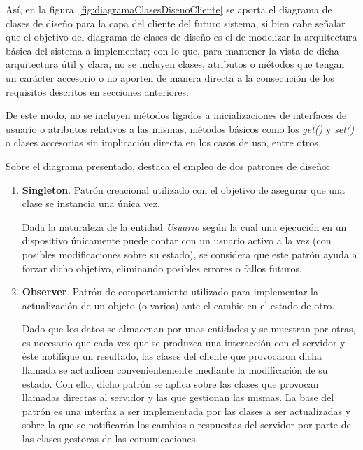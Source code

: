 Así, en la figura~\ref{fig:diagramaClasesDisenoCliente} se aporta el diagrama de clases de diseño para la capa del cliente del futuro sistema, si bien cabe señalar que el objetivo del diagrama de clases de diseño es el de modelizar la arquitectura básica del sistema a implementar; con lo que, para mantener la vista de dicha arquitectura útil y clara, no se incluyen clases, atributos o métodos que tengan un carácter accesorio o no aporten de manera directa a la consecución de los requisitos descritos en secciones anteriores. 

De este modo, no se incluyen métodos ligados a inicializaciones de interfaces de usuario o atributos relativos a las mismas, métodos básicos como los \textit{get()} y \textit{set()} o clases accesorias sin implicación directa en los casos de uso, entre otros.

Sobre el diagrama presentado, destaca el empleo de dos patrones de diseño:

\begin{enumerate}
	\item \textbf{Singleton}. Patrón creacional utilizado con el objetivo de asegurar que una clase se instancia una única vez. 
	
	Dada la naturaleza de la entidad \emph{Usuario} según la cual una ejecución en un dispositivo únicamente puede contar con un usuario activo a la vez (con posibles modificaciones sobre su estado), se considera que este patrón ayuda a forzar dicho objetivo, eliminando posibles errores o fallos futuros.
	\item \textbf{Observer}. Patrón de comportamiento utilizado para implementar la actualización de un objeto (o varios) ante el cambio en el estado de otro.
	
	Dado que los datos se almacenan por unas entidades y se muestran por otras, es necesario que cada vez que se produzca una interacción con el servidor y éste notifique un resultado, las clases del cliente que provocaron dicha llamada se actualicen convenientemente mediante la modificación de su estado. Con ello, dicho patrón se aplica sobre las clases que provocan llamadas directas al servidor y las que gestionan las mismas. La base del patrón es una interfaz a ser implementada por las clases a ser actualizadas y sobre la que se notificarán los cambios o respuestas del servidor por parte de las clases gestoras de las comunicaciones.
\end{enumerate} 

